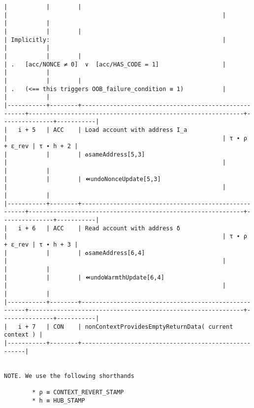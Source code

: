\documentclass[varwidth=\maxdimen,margin=0.5cm,multi={verbatim}]{standalone}
\begin{document}
\begin{verbatim}
|           |        |                                                      |                                                             |               |           |
|           |        |                                                      | Implicitly:                                                 |               |           |
|           |        |                                                      | .   [acc/NONCE ≠ 0]  ∨  [acc/HAS_CODE = 1]                  |               |           |
|           |        |                                                      | .   (<== this triggers OOB_failure_condition ≡ 1)           |               |           |
|-----------+--------+------------------------------------------------------+-------------------------------------------------------------+---------------+-----------|
|   i + 5   | ACC    | Load account with address I_a                        |                                                             | τ ∙ ρ + ε_rev | τ ∙ h + 2 |
|           |        | ♻️sameAddress[5,3]                                   |                                                             |               |           |
|           |        | ⏪undoNonceUpdate[5,3]                               |                                                             |               |           |
|-----------+--------+------------------------------------------------------+-------------------------------------------------------------+---------------+-----------|
|   i + 6   | ACC    | Read account with address δ                          |                                                             | τ ∙ ρ + ε_rev | τ ∙ h + 3 |
|           |        | ♻️sameAddress[6,4]                                   |                                                             |               |           |
|           |        | ⏪undoWarmthUpdate[6,4]                              |                                                             |               |           |
|-----------+--------+------------------------------------------------------+-------------------------------------------------------------+---------------+-----------|
|   i + 7   | CON    | nonContextProvidesEmptyReturnData( current context ) |
|-----------+--------+------------------------------------------------------|


NOTE. We use the following shorthands

        * ρ ≡ CONTEXT_REVERT_STAMP
        * h ≡ HUB_STAMP

\end{verbatim}
\end{document}
